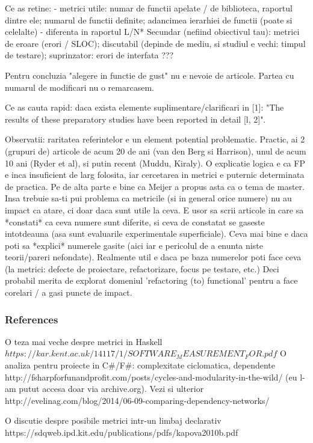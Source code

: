 \documentclass{article}
\begin{document}
Ce as retine:
- metrici utile: numar de functii apelate / de biblioteca, raportul
dintre ele; numarul de functii definite; adancimea ierarhiei de functii
(poate si celelalte)
- diferenta in raportul L/N*
Secundar (nefiind obiectivul tau): metrici de eroare (erori / SLOC);
discutabil (depinde de mediu, si studiul e vechi: timpul de testare);
suprinzator: erori de interfata ???

Pentru concluzia "alegere in functie de gust" nu e nevoie de articole.
Partea cu numarul de modificari nu o remarcasem.

Ce as cauta rapid: daca exista elemente suplimentare/clarificari in [1]:
"The results of these preparatory studies have been reported in detail
[l, 2]".

Observatii: raritatea referintelor e un element potential problematic.
Practic, ai 2 (grupuri de) articole de acum 20 de ani (van den Berg si
Harrison), unul de acum 10 ani (Ryder et al), si putin recent (Muddu,
Kiraly). O explicatie logica e ca FP e inca insuficient de larg folosita,
iar cercetarea in metrici e puternic determinata de practica.
Pe de alta parte e bine ca Meijer a propus asta ca o tema de master.
Insa trebuie sa-ti pui problema ca metricile (si in general orice numere)
nu au impact ca atare, ci doar daca sunt utile la ceva. E usor sa scrii
articole in care sa *constati* ca ceva numere sunt diferite, si ceva de
constatat se gaseste intotdeauna (asa sunt evaluarile experimentale
superficiale). Ceva mai bine e daca poti sa *explici* numerele gasite
(aici iar e pericolul de a enunta niste teorii/pareri nefondate).
Realmente util e daca pe baza numerelor poti face ceva (la metrici:
defecte de proiectare, refactorizare, focus pe testare, etc.)
Deci probabil merita de explorat domeniul 'refactoring (to) functional'
pentru a face corelari / a gasi puncte de impact.

\subsubsection {References}

O teza mai veche despre metrici in Haskell
        $https://kar.kent.ac.uk/14117/1/SOFTWARE_MEASUREMENT_FOR.pdf$
O analiza pentru proiecte in C\#/F\#: complexitate ciclomatica, dependente
        http://fsharpforfunandprofit.com/posts/cycles-and-modularity-in-the-wild/
(eu l-am putut accesa doar via archive.org). Vezi si ulterior
        http://evelinag.com/blog/2014/06-09-comparing-dependency-networks/

O discutie despre posibile metrici intr-un limbaj declarativ
        https://sdqweb.ipd.kit.edu/publications/pdfs/kapova2010b.pdf
\end{document}
